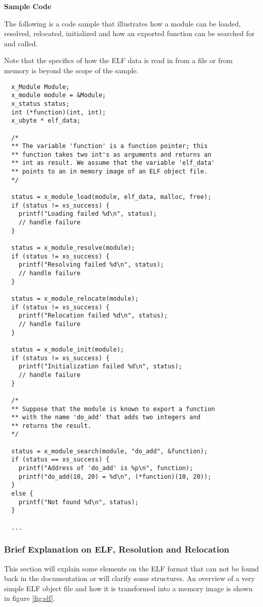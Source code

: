 \textbf{Sample Code}

The following is a code sample that illustrates how a module can be loaded,
resolved, relocated, initialized and how an exported function can be
searched for and called.

Note that the specifics of how the ELF data is read in from a file or from
memory is beyond the scope of the sample.

\bcode
\begin{verbatim}
  x_Module Module;
  x_module module = &Module;
  x_status status;
  int (*function)(int, int); 
  x_ubyte * elf_data;

  /*
  ** The variable 'function' is a function pointer; this 
  ** function takes two int's as arguments and returns an
  ** int as result. We assume that the variable 'elf_data' 
  ** points to an in memory image of an ELF object file.
  */

  status = x_module_load(module, elf_data, malloc, free);
  if (status != xs_success) {
    printf("Loading failed %d\n", status);
    // handle failure
  }

  status = x_module_resolve(module);
  if (status != xs_success) {
    printf("Resolving failed %d\n", status);
    // handle failure
  }

  status = x_module_relocate(module);
  if (status != xs_success) {
    printf("Relocation failed %d\n", status);
    // handle failure
  }
    
  status = x_module_init(module);
  if (status != xs_success) {
    printf("Initialization failed %d\n", status);
    // handle failure
  }

  /*
  ** Suppose that the module is known to export a function 
  ** with the name 'do_add' that adds two integers and 
  ** returns the result.
  */

  status = x_module_search(module, "do_add", &function);
  if (status == xs_success) {  
    printf("Address of 'do_add' is %p\n", function);
    printf("do_add(10, 20) = %d\n", (*function)(10, 20));
  }
  else {
    printf("Not found %d\n", status);
  }

  ...
\end{verbatim}
\ecode

\subsubsection{Brief Explanation on ELF, Resolution and Relocation}

This section will explain some elements on the ELF format that can not be
found back in the documentation or will clarify some structures. An overview
of a very simple ELF object file and how it is transformed into a memory
image is shown in figure \ref{fig:elf}.

